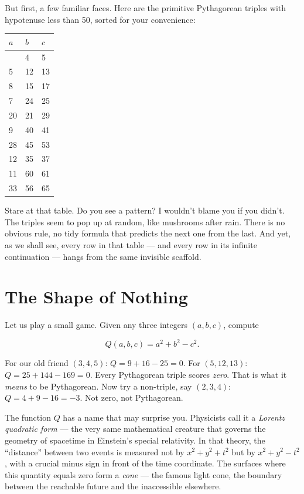 But first, a few familiar faces. Here are the primitive Pythagorean triples with hypotenuse less than 50, sorted for your convenience:

\begin{longtable}[]{@{}lll@{}}
\toprule\noalign{}
\(a\) & \(b\) & \(c\) \\
\midrule\noalign{}
\endhead
\bottomrule\noalign{}
\endlastfoot
3 & 4 & 5 \\
5 & 12 & 13 \\
8 & 15 & 17 \\
7 & 24 & 25 \\
20 & 21 & 29 \\
9 & 40 & 41 \\
28 & 45 & 53 \\
12 & 35 & 37 \\
11 & 60 & 61 \\
33 & 56 & 65 \\
\end{longtable}

Stare at that table. Do you see a pattern? I wouldn't blame you if you didn't. The triples seem to pop up at random, like mushrooms after rain. There is no obvious rule, no tidy formula that predicts the next one from the last. And yet, as we shall see, every row in that table --- and every row in its infinite continuation --- hangs from the same invisible scaffold.



\section{The Shape of Nothing}\label{ch1-the-shape-of-nothing}

Let us play a small game. Given any three integers \((a, b, c)\), compute

\[Q(a, b, c) = a^2 + b^2 - c^2.\]

For our old friend \((3, 4, 5)\): \(Q = 9 + 16 - 25 = 0\). For \((5, 12, 13)\): \(Q = 25 + 144 - 169 = 0\). Every Pythagorean triple scores \emph{zero}. That is what it \emph{means} to be Pythagorean. Now try a non-triple, say \((2, 3, 4)\): \(Q = 4 + 9 - 16 = -3\). Not zero, not Pythagorean.

The function \(Q\) has a name that may surprise you. Physicists call it a \emph{Lorentz quadratic form} --- the very same mathematical creature that governs the geometry of spacetime in Einstein's special relativity. In that theory, the ``distance'' between two events is measured not by \(x^2 + y^2 + t^2\) but by \(x^2 + y^2 - t^2\), with a crucial minus sign in front of the time coordinate. The surfaces where this quantity equals zero form a \emph{cone} --- the famous light cone, the boundary between the reachable future and the inaccessible elsewhere.


